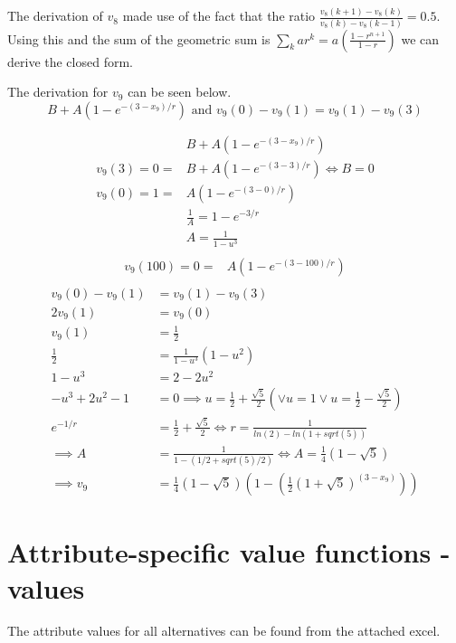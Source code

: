 \documentclass{article}
\begin{document}
The derivation of $v_8$ made use of the fact that the ratio $ \frac{v_8(k+1)- v_8(k)}{v_8(k)- v_8(k-1)}=0.5$. Using this and the sum of the geometric sum is $\sum_{k}ar^k = a\left(\frac{1-r^{n+1}}{1-r}\right)$ we can derive the closed form.

The derivation for $v_9$ can be seen below.
\begin{equation}
B+A(1-e^{-(3-x_9)/r}) \text{ and } v_9(0)-v_9(1) = v_9(1) - v_9(3)
\end{equation}

\begin{align}
&B+A(1-e^{-(3-x_9)/r})\\ 
v_9(3) = 0 =& B+A(1-e^{-(3-3)/r}) \iff B= 0 \\
v_9(0) = 1 =& A(1-e^{-(3-0)/r}) \\
& \frac{1}{A}= 1 - e^{-3/r} \\
& A= \frac{1}{1-u^3} \\
\end{align}
\begin{align}
v_9(100)= 0 =& A(1-e^{-(3-100)/r})\\
\end{align}
\begin{align}
v_9(0)-v_9(1) &= v_9(1) - v_9(3)\\
2v_9(1) &= v_9(0)\\
v_9(1) &= \frac{1}{2}\\
\frac{1}{2} &= \frac{1}{1-u^3}(1-u^{2})\\
1-u^3 &= 2-2u^2\\
-u^3 + 2u^2 - 1 &= 0 \implies  u=\frac{1}{2}+\frac{\sqrt{5}}{2} \left(\lor u=1 \lor u=\frac{1}{2}-\frac{\sqrt{5}}{2}\right) \\
e^{-1/r} &= 	\frac{1}{2}+\frac{\sqrt{5}}{2} \iff r = \frac{1}{ln(2) - ln(1 + sqrt(5))}	\\
\implies A&= \frac{1}{1-( 1/2 + sqrt(5)/2)} \iff A= \frac{1}{4}(1-\sqrt{5}) \\
\implies v_9&= \frac{1}{4}(1-\sqrt{5})\left(1-\left(\frac{1}{2}\left(1+\sqrt{5}\right)^{(3-x_9)}\right)\right)
\end{align}
\section{Attribute-specific value functions - values}
		The attribute values for all alternatives can be found from the attached excel.
\end{document}
